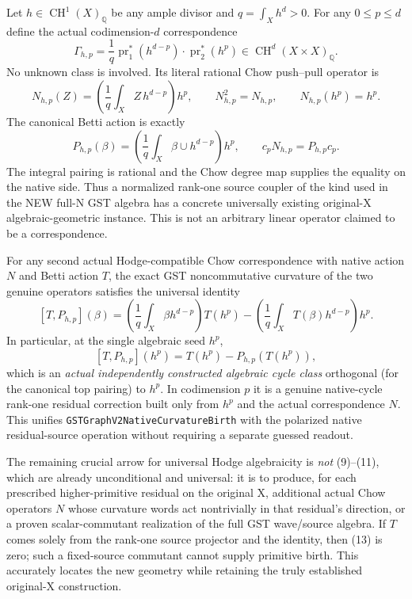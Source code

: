 \documentclass[11pt]{article}
\newcommand{\Q}{\mathbb Q}
\newcommand{\CH}{\operatorname{CH}}
\begin{document}
Let $h\in\CH^1(X)_\Q$ be any ample divisor and $q=\int_Xh^d>0$. For any $0\le p\le d$ define the actual codimension-$d$ correspondence
\[
 \boxed{
 \Gamma_{h,p}=
 \frac{1}{q}\operatorname{pr}_1^*(h^{d-p})
              \cdot\operatorname{pr}_2^*(h^p)
 \in\CH^d(X\times X)_\Q.}
\tag{9}
\]
No unknown class is involved. Its literal rational Chow push--pull operator is
\[
 \boxed{
 N_{h,p}(Z)=\left(\frac1q\int_X Z\,h^{d-p}\right)h^p,
 \qquad N_{h,p}^2=N_{h,p},
 \qquad N_{h,p}(h^p)=h^p.}
\tag{10}
\]
The canonical Betti action is exactly
\[
 \boxed{
 P_{h,p}(\beta)=\left(\frac1q\int_X\beta\cup h^{d-p}\right)h^p,
 \qquad
 c_pN_{h,p}=P_{h,p}c_p.}
\tag{11}
\]
The integral pairing is rational and the Chow degree map supplies the equality on the native side. Thus a normalized rank-one source coupler of the kind used in the NEW full-N GST algebra has a concrete universally existing original-X algebraic-geometric instance. This is not an arbitrary linear operator claimed to be a correspondence.

For any second actual Hodge-compatible Chow correspondence with native action $N$ and Betti action $T$, the exact GST noncommutative curvature of the two genuine operators satisfies the universal identity
\[
 \boxed{
 [T,P_{h,p}](\beta)
 =\left(\frac1q\int_X\beta h^{d-p}\right)T(h^p)
  -\left(\frac1q\int_XT(\beta)h^{d-p}\right)h^p.}
\tag{12}
\]
In particular, at the single algebraic seed $h^p$,
\[
 \boxed{[T,P_{h,p}](h^p)=T(h^p)-P_{h,p}(T(h^p)),}
 \tag{13}
\]
which is an \emph{actual independently constructed algebraic cycle class} orthogonal (for the canonical top pairing) to $h^p$. In codimension $p$ it is a genuine native-cycle rank-one residual correction built only from $h^p$ and the actual correspondence $N$. This unifies \texttt{GSTGraphV2NativeCurvatureBirth} with the polarized native residual-source operation without requiring a separate guessed readout.

The remaining crucial arrow for universal Hodge algebraicity is \emph{not} (9)--(11), which are already unconditional and universal: it is to produce, for each prescribed higher-primitive residual on the original X, additional actual Chow operators $N$ whose curvature words act nontrivially in that residual's direction, or a proven scalar-commutant realization of the full GST wave/source algebra. If $T$ comes solely from the rank-one source projector and the identity, then (13) is zero; such a fixed-source commutant cannot supply primitive birth. This accurately locates the new geometry while retaining the truly established original-X construction.
\end{document}
